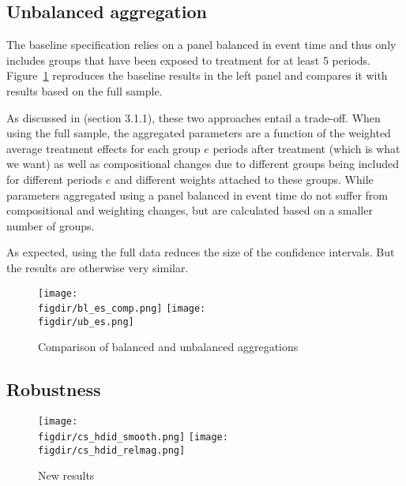 \subsection{Unbalanced aggregation}%
\label{sub:unbalanced_aggregation}

The baseline specification relies on a panel balanced in event time and
thus only includes groups that have been exposed to treatment for at least 5
periods. Figure~\ref{fig:ub_comp} reproduces the baseline results in the left
panel and compares it with results based on the full sample.

As discussed in \citet{callaway2021difference} (section 3.1.1), these two
approaches entail a trade-off. When using the full sample, the aggregated
parameters are a function of the weighted average treatment effects for each
group $e$ periods after treatment (which is what we want) as well as
compositional changes due to different groups being included for different
periods $e$ and different weights attached to these groups. While parameters
aggregated using a panel balanced in event time do not suffer from
compositional and weighting changes, but are calculated based on a smaller
number of groups.

As expected, using the full data reduces the size of the confidence intervals.
But the results are otherwise very similar.

\begin{figure}[H]
    \centering
    \caption{Comparison of balanced and unbalanced aggregations}%
    \label{fig:ub_comp}
    \texttt{[image: \\figdir/bl\_es\_comp.png]}
    \texttt{[image: \\figdir/ub\_es.png]}
\end{figure}




\subsection{Robustness}%
\label{sub:robustness}

\begin{figure}[H]
    \centering
    \caption{New results}%
    \label{fig:new}
    \texttt{[image: \\figdir/cs\_hdid\_smooth.png]}
    \texttt{[image: \\figdir/cs\_hdid\_relmag.png]}
\end{figure}











